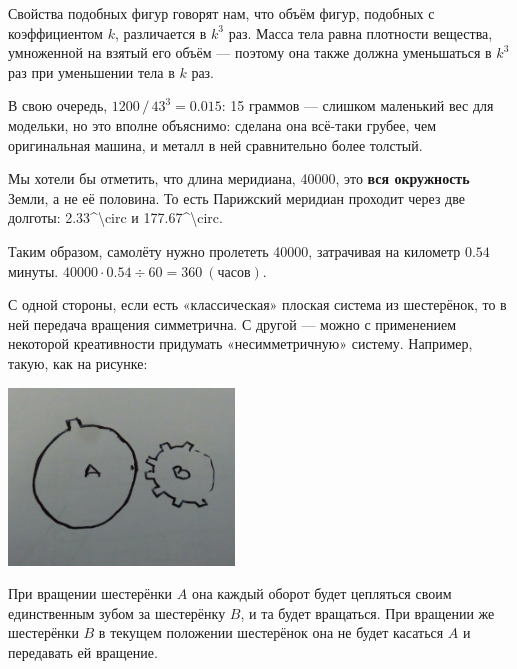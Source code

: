 \begin{itemize}
\itA Свойства подобных фигур говорят нам, что объём фигур, подобных с коэффициентом $k$, различается в $k^3$ раз. Масса тела равна плотности вещества, умноженной на взятый его объём — поэтому она также должна уменьшаться в $k^3$ раз при уменьшении тела в $k$ раз.

В свою очередь, $1200\,/\,43^3 = 0.015$: 15 граммов — слишком маленький вес для модельки, но это вполне объяснимо: сделана она всё-таки грубее, чем оригинальная машина, и металл в ней сравнительно более толстый.

\itB Мы хотели бы отметить, что длина меридиана, \SI{40000}{}, это {\bf вся окружность} Земли, а не её половина. То есть Парижский меридиан проходит через две долготы: \SI{2.33^\circ}{} и \SI{177.67^\circ}{}.

Таким образом, самолёту нужно пролететь \SI{40000}{}, затрачивая на километр $0.54$ минуты. $40000 \cdot 0.54 \div 60 = \SI{360}{(\text{часов})}$.

\itC С одной стороны, если есть «классическая» плоская система из шестерёнок, то в ней передача вращения симметрична. С другой — можно с применением некоторой креативности придумать «несимметричную» систему. Например, такую, как на рисунке:

\begin{center}
\includegraphics[natwidth=2560,natheight=2011,width=6cm]{figures/2018-models}
\end{center}

При вращении шестерёнки $A$ она каждый оборот будет цепляться своим единственным зубом за шестерёнку $B$, и та будет вращаться. При вращении же шестерёнки $B$ в текущем положении шестерёнок она не будет касаться $A$ и передавать ей вращение.

\end{itemize}
